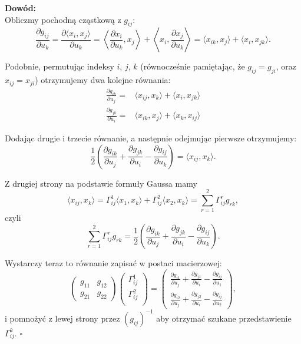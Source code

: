 \begin{frame}

\textcolor{ared}{\textbf{Dowód: }}\\\pause
Obliczmy pochodną cząstkową z $g_{ij}$:
\[\frac{\partial{g_{ij}}}{\partial u_k}=\frac{\partial\langle x_i,x_j \rangle}{\partial u_k}=\left\langle \frac{\partial x_i}{\partial u_k},x_j \right\rangle + \left\langle x_i,\frac{\partial x_j}{\partial u_k}\right\rangle=\langle x_{ik},x_j\rangle+\langle x_i,x_{jk}\rangle.\]


\pause Podobnie, permutując indeksy $i$, $j$, $k$ (równocześnie pamiętając, że $g_{ij}=g_{ji}$, oraz $x_{ij}=x_{ji}$) otrzymujemy dwa kolejne równania:
\begin{align*}
\frac{\partial{g_{ik}}}{\partial u_j}=&\langle x_{ij},x_k\rangle+\langle x_i,x_{jk}\rangle\\
\frac{\partial{g_{jk}}}{\partial u_i}=&\langle x_{ik},x_j\rangle+\langle x_k,x_{ij}\rangle
\end{align*}

\pause Dodając drugie i trzecie równanie, a następnie odejmując pierwsze otrzymujemy:
\[\frac{1}{2}\left(\frac{\partial{g_{ik}}}{\partial u_j}+\frac{\partial{g_{jk}}}{\partial u_i}- \frac{\partial{g_{ij}}}{\partial u_k}\right)=\langle x_{ij},x_{k}\rangle.\]

\end{frame}
\begin{frame}

Z drugiej strony na podstawie formuły Gaussa mamy 
\[\langle x_{ij},x_{k}\rangle=\Gamma^1_{ij}\langle x_1,x_k\rangle+ \Gamma^2_{ij}\langle x_2,x_k\rangle=\sum_{r=1}^2\Gamma^r_{ij}g_{rk},\]
\pause czyli 
\[\sum_{r=1}^2\Gamma^r_{ij}g_{rk}=\frac{1}{2}\left(\frac{\partial{g_{ik}}}{\partial u_j}+\frac{\partial{g_{jk}}}{\partial u_i}- \frac{\partial{g_{ij}}}{\partial u_k}\right).\]


\pause Wystarczy teraz to równanie zapisać w postaci macierzowej:
\[
\left(
\begin{array}{cc}
g_{11} & g_{12}\\
g_{21} & g_{22}
\end{array}
\right) 
\left(
\begin{array}{c}
\Gamma^1_{ij}\\
\Gamma^2_{ij}\\
\end{array}
\right)
=
\left(
\begin{array}{c}
\frac{\partial g_{i1}}{\partial u_j}+\frac{\partial g_{j1}}{\partial u_i}-\frac{\partial g_{ij}}{\partial u_1}\\
\frac{\partial g_{i2}}{\partial u_j}+\frac{\partial g_{j2}}{\partial u_i}-\frac{\partial g_{ij}}{\partial u_2}
\end{array}
\right), 
\]
\pause i pomnożyć z lewej strony przez $(g_{ij})^{-1}$ aby otrzymać szukane przedstawienie $\Gamma^k_{ij}$.
\hfill $\square$

\end{frame}
